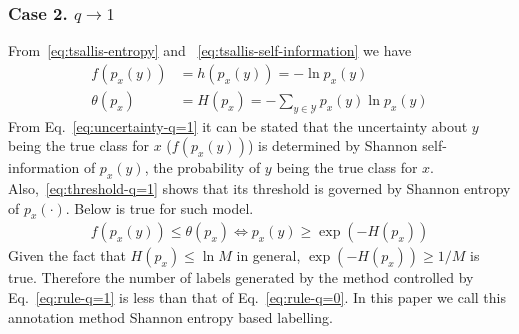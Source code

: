 \documentclass[a4paper,conference]{IEEEtran}
\begin{document}
\subsubsection{Case 2. $q \rightarrow 1$}
From~\eqref{eq:tsallis-entropy} and ~\eqref{eq:tsallis-self-information} we have
\begin{align}
    f(p_{x}(y)) &= h(p_{x}(y)) = - \ln p_{x}(y)\label{eq:uncertainty-q=1}\\
    \theta(p_{x}) &= H(p_{x}) = - \sum_{y \in \mathcal{Y}} p_{x}(y) \ln p_{x}(y)\label{eq:threshold-q=1}
\end{align}
From Eq.~\eqref{eq:uncertainty-q=1} it can be stated that the uncertainty about $y$ being the true class for $x$ ($f(p_{x}(y))$) is determined by Shannon self-information of $p_{x}(y)$, the probability of $y$ being the true class for $x$.
Also,~\eqref{eq:threshold-q=1} shows that its threshold is governed by Shannon entropy of $p_{x}(\cdot)$. 
Below is true for such model.
\begin{align}
    f(p_{x}(y)) \le \theta(p_{x}) \Leftrightarrow p_{x}(y) \ge \exp(-H(p_{x}))\label{eq:rule-q=1}
\end{align}
Given the fact that $H(p_{x}) \le \ln M$ in general, $\exp(-H(p_{x})) \ge 1/M$ is true.
Therefore the number of labels generated by the method controlled by Eq.~\eqref{eq:rule-q=1} is less than that of Eq.~\eqref{eq:rule-q=0}.
In this paper we call this annotation method Shannon entropy based labelling.

\end{document}
